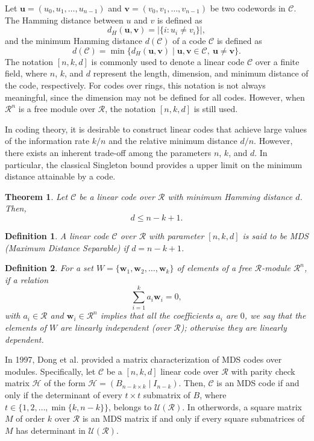 \documentclass[11pt]{article}
\newtheorem{theorem}{Theorem}
\newtheorem{definition}{Definition}
\begin{document}
Let $\textbf{u} = (u_0,u_1,\ldots,u_{n-1})$ and $\textbf{v} = (v_0,v_1,\ldots,v_{n-1})$ be two codewords in $\mathcal{C}$. The Hamming distance between $u$ and $v$
is defined as
\[
d_H(\textbf{u},\textbf{v}) = |\{i : u_i \neq v_i\}|,
\]
and the minimum Hamming distance $d(\mathcal{C})$ of a code $\mathcal{C}$ is defined as
\[
d(\mathcal{C}) = \min\{d_H(\textbf{u},\textbf{v})\mid \textbf{u},\textbf{v} \in \mathcal{C},\ \textbf{u} \neq \textbf{v}\}.
\]
The notation $[n,k,d]$ is commonly used to denote a linear code $\mathcal{C}$ over a finite field, where $n$, $k$, and $d$ represent the length, dimension, and minimum distance of the code, respectively. 
For codes over rings, this notation is not always meaningful, since the dimension may not be defined for all codes. 
However, when $\mathcal{R}^n$ is a free module over $\mathcal{R}$, the notation $[n,k,d]$ is still used.




In coding theory, it is desirable to construct linear codes that achieve large values of the information rate $k/n$ and the relative minimum distance $d/n$. However, there exists an inherent trade-off among the parameters $n$, $k$, and $d$. In particular, the classical Singleton bound provides a  upper limit on the minimum distance attainable by a code.



\begin{theorem}\cite[Theorem 1.1]{MacWilliams1977the}
Let $\mathcal{C}$ be a linear code over $\mathcal{R}$ with minimum Hamming distance $d$. Then,
\[
d \leq n-k+1.
\]
\end{theorem}

\begin{definition}
A linear code $\mathcal{C}$ over $\mathcal{R}$ with parameter $[n,k,d]$ is said to be MDS (Maximum Distance Separable) if $d = n-k+1$.
\end{definition}

\begin{definition}
For a set $W = \{\textbf{w}_1,\textbf{w}_2,\ldots,\textbf{w}_k\}$ of elements of a free $\mathcal{R}$-module $\mathcal{R}^n$, if a relation
\[
\sum_{i=1}^{k} a_i \textbf{w}_i = 0,
\]
with $a_i \in \mathcal{R}$ and $\textbf{w}_i \in \mathcal{R}^n$ implies that all the coefficients $a_i$ are $0$, we say that the elements of $W$ are linearly independent
(over $\mathcal{R}$); otherwise they are linearly dependent.
\end{definition}
In 1997, Dong et al. \cite{Dong} provided a matrix characterization of MDS codes over modules. Specifically, let $\mathcal{C}$  be a $[n,k,d]$ linear code over $\mathcal{R}$ with parity check matrix $\mathcal{H}$ of the form $\mathcal{H} = (B_{n-k\times k} \mid I_{n-k})$. Then, $\mathcal{C}$ is an MDS code if and only if the determinant of every $t \times t$ submatrix of $B$, where $t \in \{1,2,\dots,\min\{k,n-k\}\}$, belongs to $\mathcal{U}(\mathcal{R})$. In otherwords, a square matrix $M$ of order $k$ over $\mathcal{R}$ is an MDS matrix if and only if every square 
submatrices of $M$ has determinant in $\mathcal{U}(\mathcal{R})$.
\end{document}

